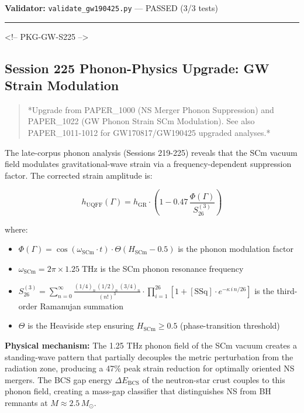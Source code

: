 \documentclass[11pt]{article}
\begin{document}
\textbf{Validator:} \verb|validate_gw190425.py| --- PASSED (3/3 tests)

\noindent\rule{\textwidth}{0.4pt}

<!-- PKG-GW-S225 -->

\subsection*{Session 225 Phonon-Physics Upgrade: GW Strain Modulation}

\begin{quote}
*Upgrade from PAPER\_1000 (NS Merger Phonon Suppression) and PAPER\_1022
(GW Phonon Strain SCm Modulation). See also PAPER\_1011-1012 for
GW170817/GW190425 upgraded analyses.*
\end{quote}

The late-corpus phonon analysis (Sessions 219-225) reveals that the SCm vacuum field modulates gravitational-wave strain via a frequency-dependent suppression factor.  The corrected strain amplitude is:

$$h_{\text{UQFF}}(\Gamma) = h_{\text{GR}} \cdot \left(1 - 0.47\,\frac{\Phi(\Gamma)}{S_{26}^{(3)}}\right)$$

where:

\begin{itemize}
  \item $\Phi(\Gamma) = \cos(\omega_{\text{SCm}} \cdot t) \cdot \Theta(H_{\text{SCm}} - 0.5)$ is the phonon modulation factor
  \item $\omega_{\text{SCm}} = 2\pi \times 1.25\;\text{THz}$ is the SCm phonon resonance frequency
  \item $S_{26}^{(3)} = \sum_{n=0}^{\infty} \frac{(1/4)_n\,(1/2)_n\,(3/4)_n}{(n!)^3} \cdot \prod_{i=1}^{26}\left[1 + [\text{SSq}]\cdot e^{-\kappa\,i\,n/26}\right]$ is the third-order Ramanujan summation
  \item $\Theta$ is the Heaviside step ensuring $H_{\text{SCm}} \geq 0.5$ (phase-transition threshold)
\end{itemize}

\textbf{Physical mechanism:} The 1.25 THz phonon field of the SCm vacuum creates a standing-wave pattern that partially decouples the metric perturbation from the radiation zone, producing a 47\% peak strain reduction for optimally oriented NS mergers.  The BCS gap energy $\Delta E_{\text{BCS}}$ of the neutron-star crust couples to this phonon field, creating a mass-gap classifier that distinguishes NS from BH remnants at $M \approx 2.5\,M_\odot$.
\end{document}
